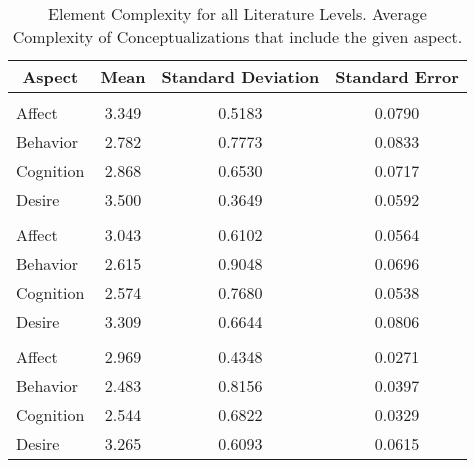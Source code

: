 \begin{table}
\begin{minipage}[t][\textheight][t]{\textwidth}

\caption{\label{tab:CombinedElementComplexity}Element Complexity for all Literature Levels. Average Complexity of Conceptualizations that include the given aspect.}
\begin{tabular}[t]{lccc}
\toprule
\multicolumn{1}{c}{Aspect} & Mean & Standard Deviation & Standard Error\\
\midrule
\addlinespace[0.3em]
\multicolumn{4}{l}{\textbf{Theoretical}}\\
\hspace{1em}Affect & 3.349 & 0.5183 & 0.0790\\
\hspace{1em}Behavior & 2.782 & 0.7773 & 0.0833\\
\hspace{1em}Cognition & 2.868 & 0.6530 & 0.0717\\
\hspace{1em}Desire & 3.500 & 0.3649 & 0.0592\\
\addlinespace[0.3em]
\multicolumn{4}{l}{\textbf{Methdological}}\\
\hspace{1em}Affect & 3.043 & 0.6102 & 0.0564\\
\hspace{1em}Behavior & 2.615 & 0.9048 & 0.0696\\
\hspace{1em}Cognition & 2.574 & 0.7680 & 0.0538\\
\hspace{1em}Desire & 3.309 & 0.6644 & 0.0806\\
\addlinespace[0.3em]
\multicolumn{4}{l}{\textbf{Empirical}}\\
\hspace{1em}Affect & 2.969 & 0.4348 & 0.0271\\
\hspace{1em}Behavior & 2.483 & 0.8156 & 0.0397\\
\hspace{1em}Cognition & 2.544 & 0.6822 & 0.0329\\
\hspace{1em}Desire & 3.265 & 0.6093 & 0.0615\\
\bottomrule
\end{tabular}
\end{minipage}
\end{table}
